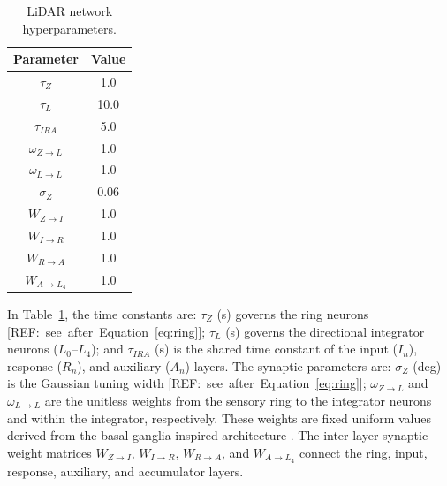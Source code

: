\documentclass[preprint,12pt]{elsarticle}
\begin{document}
\begin{table}[t]
\centering
\caption{LiDAR network hyperparameters.}
\begin{tabular}{|c|c|}
\hline
\textbf{Parameter} & \textbf{Value} \\ \hline
$\tau_{Z}$ & 1.0 \\ \hline
$\tau_{L}$ & 10.0 \\ \hline
$\tau_{IRA}$ & 5.0 \\ \hline
$\omega_{Z\rightarrow L}$ & 1.0 \\\hline
$\omega_{L\rightarrow L}$ & 1.0 \\ \hline
$\sigma_{Z}$ & 0.06 \\ \hline
$W_{Z\rightarrow I}$ & 1.0 \\ \hline
$W_{I\rightarrow R}$ & 1.0 \\ \hline
$W_{R\rightarrow A}$ & 1.0 \\ \hline
$W_{A\rightarrow L_4}$ & 1.0 \\ \hline
\end{tabular}
\label{table:LiDAR}
\end{table}
In Table~\ref{table:LiDAR}, the time constants are: $\tau_{Z}$ (s) governs the ring neurons \mbox{[REF: see after Equation~\eqref{eq:ring}]}; $\tau_{L}$ (s) governs the directional integrator neurons ($L_0$–$L_4$); and $\tau_{IRA}$ (s) is the shared time constant of the input ($I_n$), response ($R_n$), and auxiliary ($A_n$) layers.
The synaptic parameters are: $\sigma_{Z}$ (deg) is the Gaussian tuning width \mbox{[REF: see after Equation~\eqref{eq:ring}]}; $\omega_{Z\rightarrow L}$ and $\omega_{L\rightarrow L}$ are the unitless weights from the sensory ring to the integrator neurons and within the integrator, respectively. These weights are fixed uniform values derived from the basal-ganglia inspired architecture \citep{sarvestani2013computational}.
The inter-layer synaptic weight matrices $W_{Z\rightarrow I}$, $W_{I\rightarrow R}$, $W_{R\rightarrow A}$, and $W_{A\rightarrow L_4}$ connect the ring, input, response, auxiliary, and accumulator layers.
\end{document}

